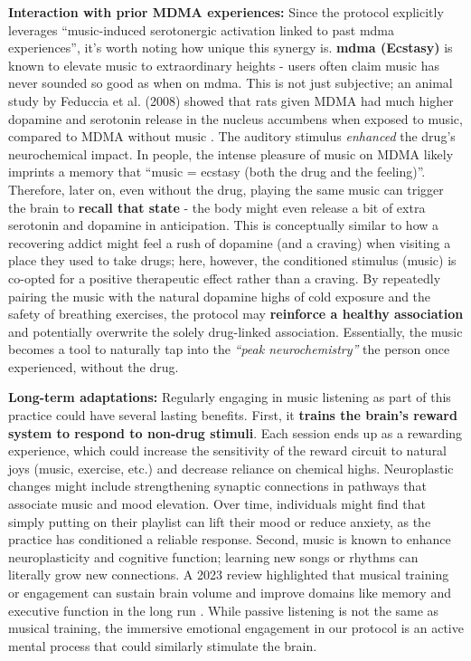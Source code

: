 \documentclass[11pt]{article}
\newcommand{\quotes}[1]{``#1''}
\begin{document}
\textbf{Interaction with prior MDMA experiences:} Since the protocol explicitly leverages \quotes{music-induced serotonergic activation linked to past mdma experiences}, it's worth noting how unique this synergy is. \textbf{mdma (Ecstasy)} is known to elevate music to extraordinary heights - users often claim music has never sounded so good as when on mdma. This is not just subjective; an animal study by Feduccia et al. (2008) showed that rats given MDMA had much higher dopamine and serotonin release in the nucleus accumbens when exposed to music, compared to MDMA without music \cite{Feduccia2008}. The auditory stimulus \textit{enhanced} the drug's neurochemical impact. In people, the intense pleasure of music on MDMA likely imprints a memory that \quotes{music = ecstasy (both the drug and the feeling)}. Therefore, later on, even without the drug, playing the same music can trigger the brain to \textbf{recall that state} - the body might even release a bit of extra serotonin and dopamine in anticipation. This is conceptually similar to how a recovering addict might feel a rush of dopamine (and a craving) when visiting a place they used to take drugs; here, however, the conditioned stimulus (music) is co-opted for a positive therapeutic effect rather than a craving. By repeatedly pairing the music with the natural dopamine highs of cold exposure and the safety of breathing exercises, the protocol may \textbf{reinforce a healthy association} and potentially overwrite the solely drug-linked association. Essentially, the music becomes a tool to naturally tap into the \textit{\quotes{peak neurochemistry}} the person once experienced, without the drug.

\textbf{Long-term adaptations:} Regularly engaging in music listening as part of this practice could have several lasting benefits. First, it \textbf{trains the brain's reward system to respond to non-drug stimuli}. Each session ends up as a rewarding experience, which could increase the sensitivity of the reward circuit to natural joys (music, exercise, etc.) and decrease reliance on chemical highs. Neuroplastic changes might include strengthening synaptic connections in pathways that associate music and mood elevation. Over time, individuals might find that simply putting on their playlist can lift their mood or reduce anxiety, as the practice has conditioned a reliable response. Second, music is known to enhance neuroplasticity and cognitive function; learning new songs or rhythms can literally grow new connections. A 2023 review highlighted that musical training or engagement can sustain brain volume and improve domains like memory and executive function in the long run \cite{brainMuriel}. While passive listening is not the same as musical training, the immersive emotional engagement in our protocol is an active mental process that could similarly stimulate the brain.
\end{document}
